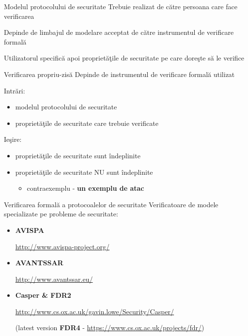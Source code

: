 \documentclass{beamer}
\begin{document}
\begin{frame}{Modelul protocolului de securitate}
Trebuie realizat de către persoana care face verificarea

\vspace{0.5cm}

Depinde de limbajul de modelare acceptat de către instrumentul de verificare formală

\vspace{0.5cm}

Utilizatorul specifică apoi proprietăţile de securitate pe care doreşte să le verifice

\end{frame}



\begin{frame}{Verificarea propriu-zisă}
Depinde de instrumentul de verificare formală utilizat

\vspace{0.5cm}

Intrări:
\begin{itemize}
\item
modelul protocolului de securitate
\item
proprietăţile de securitate care trebuie verificate
\end{itemize}

Ieşire:
\begin{itemize}
\item
proprietăţile de securitate sunt îndeplinite
\item
proprietăţile de securitate NU sunt îndeplinite
\begin{itemize}
\item
contraexemplu - \textbf{un exemplu de atac}
\end{itemize}
\end{itemize}
\end{frame}



\begin{frame}{Verificarea formală a protocoalelor de securitate}
Verificatoare de modele specializate pe probleme de securitate:
\begin{itemize}
\item
\textbf{AVISPA}

\url{http://www.avispa-project.org/}
\newline

\item
\textbf{AVANTSSAR}

\url{http://www.avantssar.eu/}
\newline

\item
\textbf{Casper \& FDR2}

\url{http://www.cs.ox.ac.uk/gavin.lowe/Security/Casper/}

(latest version \textbf{FDR4} - \url{https://www.cs.ox.ac.uk/projects/fdr/})
\newline

\end{itemize}
\end{frame}
\end{document}

